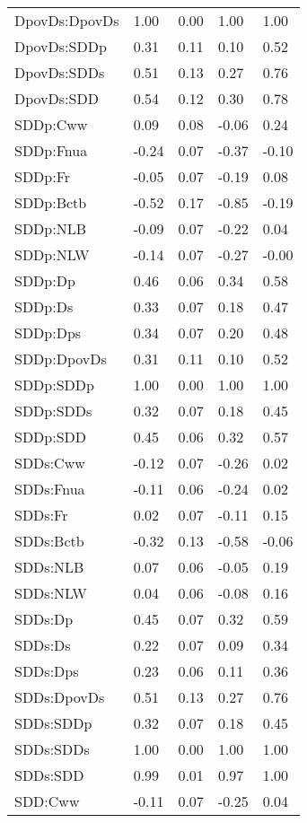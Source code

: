\begin{center}
\begin{longtable}{|p{0.9in}|p{0.7in}|p{0.7in}|p{0.7in}|p{0.7in}|}
  DpovDs:DpovDs & 1.00 & 0.00 & 1.00 & 1.00 \\ 
  DpovDs:SDDp & 0.31 & 0.11 & 0.10 & 0.52 \\ 
  DpovDs:SDDs & 0.51 & 0.13 & 0.27 & 0.76 \\ 
  DpovDs:SDD & 0.54 & 0.12 & 0.30 & 0.78 \\ 
  SDDp:Cww & 0.09 & 0.08 & -0.06 & 0.24 \\ 
  SDDp:Fnua & -0.24 & 0.07 & -0.37 & -0.10 \\ 
  SDDp:Fr & -0.05 & 0.07 & -0.19 & 0.08 \\ 
  SDDp:Bctb & -0.52 & 0.17 & -0.85 & -0.19 \\ 
  SDDp:NLB & -0.09 & 0.07 & -0.22 & 0.04 \\ 
  SDDp:NLW & -0.14 & 0.07 & -0.27 & -0.00 \\ 
  SDDp:Dp & 0.46 & 0.06 & 0.34 & 0.58 \\ 
  SDDp:Ds & 0.33 & 0.07 & 0.18 & 0.47 \\ 
  SDDp:Dps & 0.34 & 0.07 & 0.20 & 0.48 \\ 
  SDDp:DpovDs & 0.31 & 0.11 & 0.10 & 0.52 \\ 
  SDDp:SDDp & 1.00 & 0.00 & 1.00 & 1.00 \\ 
  SDDp:SDDs & 0.32 & 0.07 & 0.18 & 0.45 \\ 
  SDDp:SDD & 0.45 & 0.06 & 0.32 & 0.57 \\ 
  SDDs:Cww & -0.12 & 0.07 & -0.26 & 0.02 \\ 
  SDDs:Fnua & -0.11 & 0.06 & -0.24 & 0.02 \\ 
  SDDs:Fr & 0.02 & 0.07 & -0.11 & 0.15 \\ 
  SDDs:Bctb & -0.32 & 0.13 & -0.58 & -0.06 \\ 
  SDDs:NLB & 0.07 & 0.06 & -0.05 & 0.19 \\ 
  SDDs:NLW & 0.04 & 0.06 & -0.08 & 0.16 \\ 
  SDDs:Dp & 0.45 & 0.07 & 0.32 & 0.59 \\ 
  SDDs:Ds & 0.22 & 0.07 & 0.09 & 0.34 \\ 
  SDDs:Dps & 0.23 & 0.06 & 0.11 & 0.36 \\ 
  SDDs:DpovDs & 0.51 & 0.13 & 0.27 & 0.76 \\ 
  SDDs:SDDp & 0.32 & 0.07 & 0.18 & 0.45 \\ 
  SDDs:SDDs & 1.00 & 0.00 & 1.00 & 1.00 \\ 
  SDDs:SDD & 0.99 & 0.01 & 0.97 & 1.00 \\ 
  SDD:Cww & -0.11 & 0.07 & -0.25 & 0.04 \\ 

\end{longtable}
\end{center}
